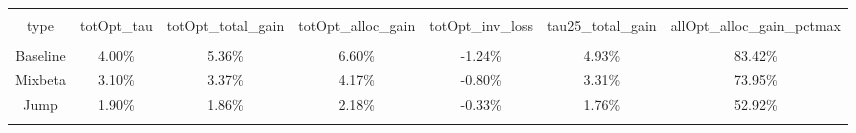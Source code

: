 
\begin{table}[!htbp] \centering 
  \caption{} 
  \label{} 
\begin{tabular}{@{\extracolsep{5pt}} ccccccc} 
\\[-1.8ex]\hline 
\hline \\[-1.8ex] 
type & totOpt\_tau & totOpt\_total\_gain & totOpt\_alloc\_gain & totOpt\_inv\_loss & tau25\_total\_gain & allOpt\_alloc\_gain\_pctmax \\ 
\hline \\[-1.8ex] 
Baseline & 4.00\% & 5.36\% & 6.60\% & -1.24\% & 4.93\% & 83.42\% \\ 
Mixbeta & 3.10\% & 3.37\% & 4.17\% & -0.80\% & 3.31\% & 73.95\% \\ 
Jump & 1.90\% & 1.86\% & 2.18\% & -0.33\% & 1.76\% & 52.92\% \\ 
\hline \\[-1.8ex] 
\end{tabular} 
\end{table} 
